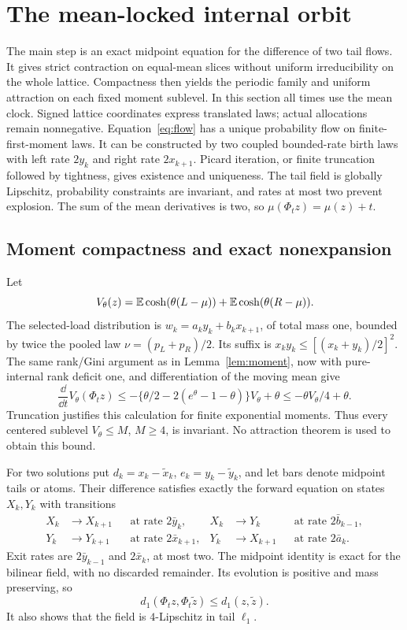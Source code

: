 \section{The mean-locked internal orbit}\label{sec:profile}
The main step is an exact midpoint equation for the difference of two tail
flows. It gives strict contraction on equal-mean slices without uniform
irreducibility on the whole lattice. Compactness then yields the periodic
family and uniform attraction on each fixed moment sublevel.
In this section all times use the mean clock. Signed lattice coordinates express translated laws; actual allocations remain nonnegative. Equation~\eqref{eq:flow} has a unique probability flow on finite-first-moment laws. It can be constructed by two coupled bounded-rate birth laws with left rate $2y_k$ and right rate $2x_{k+1}$. Picard iteration, or finite truncation followed by tightness, gives existence and uniqueness. The tail field is globally Lipschitz, probability constraints are invariant, and rates at most two prevent explosion. The sum of the mean derivatives is two, so $\mu(\Phi_tz)=\mu(z)+t$.

\subsection{Moment compactness and exact nonexpansion}
Let
\[
 V_\theta(z)=\mathbb E\cosh(\theta(L-\mu))+\mathbb E\cosh(\theta(R-\mu)).
\]
The selected-load distribution is $w_k=a_ky_k+b_kx_{k+1}$, of total mass one, bounded by twice the pooled law $\nu=(p_L+p_R)/2$. Its suffix is $x_ky_k\le[(x_k+y_k)/2]^2$. The same rank/Gini argument as in Lemma~\ref{lem:moment}, now with pure-internal rank deficit one, and differentiation of the moving mean give
\begin{equation}\label{eq:fluidmoment}
 \frac\dd{\dd t}V_\theta(\Phi_tz)
 \le-\{\theta/2-2(e^\theta-1-\theta)\}V_\theta+\theta
 \le-\theta V_\theta/4+\theta.
\end{equation}
Truncation justifies this calculation for finite exponential moments. Thus every centered sublevel $V_\theta\le M$, $M\ge4$, is invariant. No attraction theorem is used to obtain this bound.

For two solutions put $d_k=x_k-\widetilde x_k$, $e_k=y_k-\widetilde y_k$, and let bars denote midpoint tails or atoms. Their difference satisfies exactly the forward equation on states $X_k,Y_k$ with transitions
\begin{align*}
 X_k&\longrightarrow X_{k+1} &&\text{at rate }2\bar y_k,&
 X_k&\longrightarrow Y_k &&\text{at rate }2\bar b_{k-1},\\
 Y_k&\longrightarrow Y_{k+1} &&\text{at rate }2\bar x_{k+1},&
 Y_k&\longrightarrow X_{k+1} &&\text{at rate }2\bar a_k.
\end{align*}
Exit rates are $2\bar y_{k-1}$ and $2\bar x_k$, at most two. The midpoint identity is exact for the bilinear field, with no discarded remainder. Its evolution is positive and mass preserving, so
\begin{equation}\label{eq:nonexp}
 d_1(\Phi_tz,\Phi_t\widetilde z)\le d_1(z,\widetilde z).
\end{equation}
It also shows that the field is $4$-Lipschitz in tail $\ell_1$.

